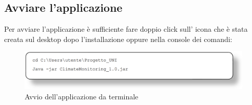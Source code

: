 \subsection{Avviare l'applicazione}
Per avviare l’applicazione è sufficiente fare doppio click sull’ icona che è stata creata sul desktop dopo
l’installazione oppure nella console dei comandi:

\begin{figure}[H]
    \centering
    \includegraphics[width=1\textwidth]{../../img/avvio_terminal.png}
    \caption{Avvio dell'applicazione da terminale}
\end{figure}